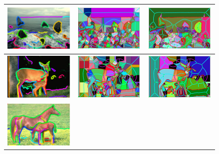 \begin{figure}[!ht]
\begin{tabular}{|c|c|c|}
\hline
\includegraphics[width=0.33\linewidth]{figs/117054_00_cons.pdf} &
\includegraphics[width=0.33\linewidth]{figs/117054_00_type1_atomic_frags.pdf} &
\includegraphics[width=0.33\linewidth]{figs/117054_00_mvf_frags.pdf}\\
\hline
\includegraphics[width=0.33\linewidth]{figs/317080_00_cons.pdf} &
\includegraphics[width=0.33\linewidth]{figs/317080_00_type1_atomic_frags.pdf} &
\includegraphics[width=0.33\linewidth]{figs/317080_00_mvf_frags.pdf}\\
\hline
\includegraphics[width=0.33\linewidth]{figs/113044_00_cons.pdf} &

\end{tabular}
\end{figure}
